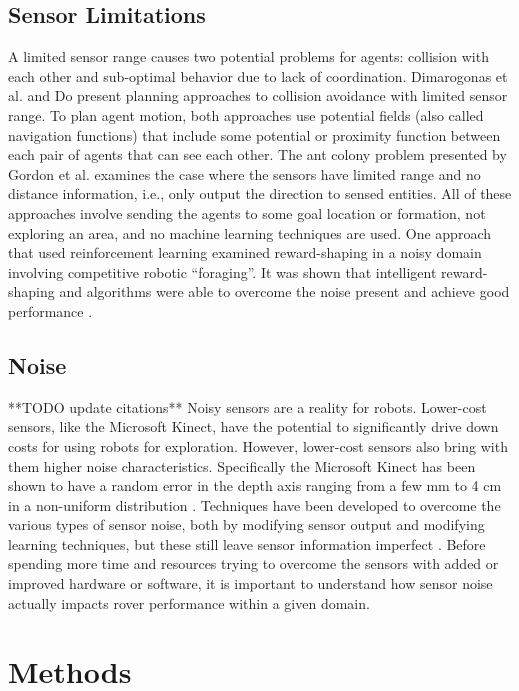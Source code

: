 \documentclass[letterpaper, 10 pt, conference]{ieeeconf}  %
\begin{document}
\subsection{Sensor Limitations}
A limited sensor range causes two potential problems for agents:
collision with each other and sub-optimal behavior due to lack of
coordination. Dimarogonas et al. \cite{dimarogonas2007decentralized} and Do \cite{do2007bounded} present planning approaches to collision avoidance with limited sensor range. To plan agent motion, both approaches use potential fields (also called
navigation functions) that include some potential or proximity function between each pair of agents that can see each other. The ant colony problem presented by Gordon et al. \cite{gordon2004gathering} examines the case where the sensors have limited range and no distance information, i.e., only output the direction to sensed entities. All of these approaches involve sending the agents to some goal location or formation, not exploring an area, and no machine learning techniques are used. One approach that used reinforcement learning examined reward-shaping in a noisy domain involving competitive robotic “foraging”. It was shown that intelligent reward-shaping and algorithms were able to overcome the noise present and achieve good performance \cite{mataric1997reinforcement}.

\subsection{Noise}
**TODO update citations**
Noisy sensors are a reality for robots. Lower-cost sensors, like the Microsoft Kinect, have the potential to significantly drive down costs for using robots for exploration. However, lower-cost sensors also bring with them higher noise characteristics. Specifically the Microsoft Kinect has been shown to have a random error in the depth axis ranging from a few mm to 4 cm in a non-uniform distribution \cite{khoshelham2012accuracy,nguyen2012modeling}. Techniques have been developed to overcome the various types of sensor noise, both by modifying sensor output and modifying learning techniques, but these still leave sensor information imperfect \cite{nguyen2012modeling,hu2010distributed}. Before spending more time and resources trying to overcome the sensors with added or improved hardware or software, it is important to understand how sensor noise actually impacts rover performance within a given domain.


\section{Methods}
\end{document}
